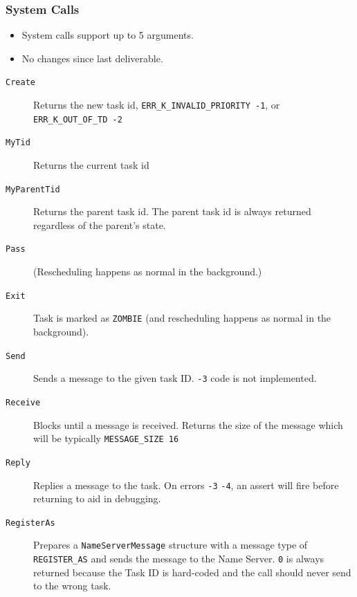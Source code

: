 \documentclass[letterpaper]{article}
\begin{document}
\subsubsection{System Calls%
  \label{system-calls}%
}
%
\begin{itemize}

\item System calls support up to 5 arguments.

\item No changes since last deliverable.

\end{itemize}
%
\begin{description}
\item[{\texttt{Create}}] \leavevmode 
Returns the new task id, \texttt{ERR\_K\_INVALID\_PRIORITY -1}, or \texttt{ERR\_K\_OUT\_OF\_TD -2}

\item[{\texttt{MyTid}}] \leavevmode 
Returns the current task id

\item[{\texttt{MyParentTid}}] \leavevmode 
Returns the parent task id. The parent task id is always returned regardless of the parent's state.

\item[{\texttt{Pass}}] \leavevmode 
(Rescheduling happens as normal in the background.)

\item[{\texttt{Exit}}] \leavevmode 
Task is marked as \texttt{ZOMBIE} (and rescheduling happens as normal in the background).

\item[{\texttt{Send}}] \leavevmode 
Sends a message to the given task ID. \texttt{-3} code is not implemented.

\item[{\texttt{Receive}}] \leavevmode 
Blocks until a message is received. Returns the size of the message which will be typically \texttt{MESSAGE\_SIZE 16}

\item[{\texttt{Reply}}] \leavevmode 
Replies a message to the task. On errors \texttt{-3} \texttt{-4}, an assert will fire before returning to aid in debugging.

\item[{\texttt{RegisterAs}}] \leavevmode 
Prepares a \texttt{NameServerMessage} structure with a message type of \texttt{REGISTER\_AS} and sends the message to the Name Server. \texttt{0} is always returned because the Task ID is hard-coded and the call should never send to the wrong task.


\end{description}
\end{document}
